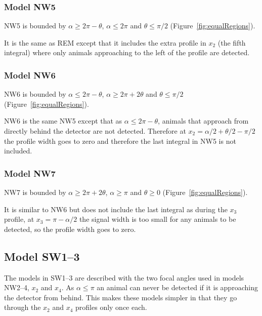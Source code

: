 \subsubsection{Model NW5} \label{NW5}

NW5 is bounded by $\alpha \ge 2\pi - \theta$, $\alpha \le 2\pi$ and $\theta \le \pi/2$ (Figure~\ref{fig:equalRegions}).

It is the same as REM except that it includes the extra profile in $x_2$ (the fifth integral) where only animals approaching to the left of the profile are detected.



\subsubsection{Model NW6} \label{NW6}

NW6 is bounded by $\alpha \le 2\pi - \theta$, $\alpha \ge 2\pi + 2\theta$ and $\theta \le \pi/2$ (Figure~\ref{fig:equalRegions}).

NW6 is the same NW5 except that as $\alpha \le 2\pi - \theta$, animals that approach from directly behind the detector are not detected.
Therefore at $x_2 = \alpha/2 + \theta/2 - \pi/2$ the profile width goes to zero and therefore the last integral in NW5 is not included.





\subsubsection{Model NW7} \label{NW7}

NW7 is bounded by $\alpha \ge 2\pi + 2\theta$, $\alpha \ge \pi$ and $\theta \ge 0$ (Figure~\ref{fig:equalRegions}).

It is similar to NW6 but does not include the last integral as during the $x_3$ profile, at $x_3 = \pi - \alpha/2$ the signal width is too small for any animals to be detected, so the profile width goes to zero.







\subsection{Model SW1--3} \label{SW13}
 
The models in SW1--3 are described with the two focal angles used in models NW2--4, $x_2$ and $x_4$.
As $\alpha \le\pi$ an animal can never be detected if it is approaching the detector from behind.
This makes these models simpler in that they go through the $x_2$ and $x_4$ profiles only once each.


